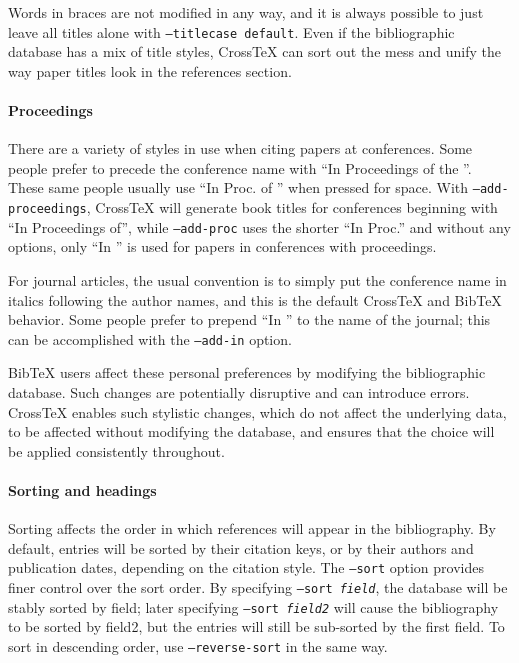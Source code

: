 \documentclass{article}
\newcommand{\XTeX}{Cross\TeX}
\begin{document}
Words in braces are not modified in any way,
and it is always possible to just leave all titles alone with
\texttt{--titlecase default}. Even if the bibliographic database has
a mix of title styles, \XTeX{} can sort out the mess and unify the way 
paper titles look in the references section.

\paragraph{Proceedings}

There are a variety of styles in use when citing papers at conferences. Some
people prefer to precede the conference name with ``In Proceedings of the ''. 
These same people usually use ``In Proc. of '' when pressed for space.
With \texttt{--add-proceedings}, \XTeX{}
will generate book titles for conferences beginning with ``In
Proceedings of'', while \texttt{--add-proc} uses the shorter ``In
Proc.'' and without any options, only ``In '' is used for papers
in conferences with proceedings. 

For journal articles, the usual convention is to simply put the 
conference name in italics following the author names, and this is
the default \XTeX{} and BibTeX behavior. Some people prefer to prepend
``In '' to the name of the journal; this can be accomplished with the 
\texttt{--add-in} option.

BibTeX users affect these personal preferences by modifying the bibliographic
database. Such changes are potentially disruptive and can introduce errors. 
\XTeX{} enables such stylistic changes, which do not affect the underlying data, 
to be affected without modifying the database, and ensures that the choice will
be applied consistently throughout.

\paragraph{Sorting and headings}

Sorting affects the order in which references will appear in the bibliography.
By default, entries will be sorted by their citation keys, or by their
authors and publication dates, depending on the citation style. 
The \texttt{--sort} option provides
finer control over the sort order. By specifying \texttt{--sort
\textrm{\textit{field}}}, the database will be stably sorted by field;
later specifying \texttt{--sort \textrm{\textit{field2}}} will cause
the bibliography to be sorted by field2, but the entries will still be
sub-sorted by the first field. To sort in descending order, 
use \texttt{--reverse-sort} in the same way.
\end{document}
